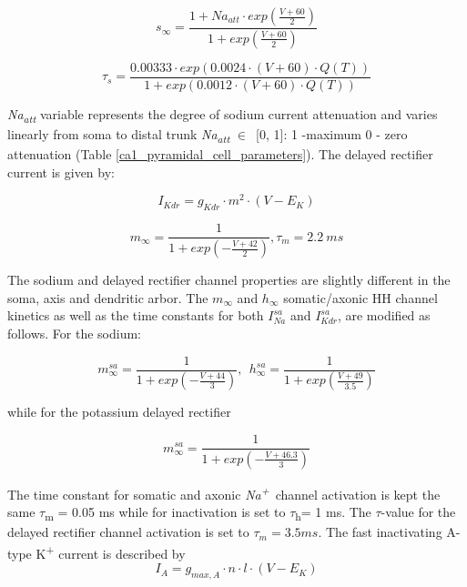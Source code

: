 \documentclass[a4paper,12pt]{article}
\begin{document}
\begin{equation}
s_{\infty}=\frac{1+Na_{att}\cdot exp(\frac{V+60}{2})}{1+exp(\frac{V+60}{2})}
\end{equation}


\begin{equation}
\tau_s=\frac{0.00333\cdot  exp(0.0024 \cdot (V+60)\cdot
		Q(T))}{1+exp(0.0012 \cdot (V+60)\cdot Q(T))}
\end{equation}

\textit{Na\textsubscript{att}} variable represents the degree of sodium current
attenuation and varies linearly from soma to distal trunk
\textit{Na\textsubscript{att}} $\in$~[0, 1]: 1 -maximum 0 - zero attenuation (Table \ref{ca1_pyramidal_cell_parameters}). The delayed rectifier current is given by:

\begin{equation}
I_{Kdr} = g_{Kdr} \cdot m^2 \cdot (V-E_K)
\end{equation}

\begin{equation}
m_{\infty}=\frac{1}{1+exp(-\frac{V+42}{2})}, \tau_m = 2.2 \ ms
\end{equation}

The sodium and delayed rectifier channel properties are slightly different in the soma, axis and dendritic arbor. The $m_{\infty}$ and $h_{\infty}$
somatic/axonic HH channel kinetics as well as the time constants for both $I_{Na}^{sa}$ and $I_{Kdr}^{sa}$, are modified as follows. For the sodium:

\begin{equation}
m_{\infty}^{sa}=\frac {1}{1+exp(-\frac{V+44}{3})} ,\ \ 
h_{\infty}^{sa}=\frac {1}{1+exp(\frac{V+49}{3.5})}
\end{equation}

while for the potassium delayed rectifier

\begin{equation}
m_{\infty}^{sa}=\frac {1}{1+exp(-\frac{V+46.3}{3})}
\end{equation}

The time constant for somatic and axonic \textit{Na\textsuperscript{+}}~channel activation is kept the
same $\tau$\textsubscript{m} = 0.05 ms while for inactivation is set to $\tau$\textsubscript{h}= 1 ms. The $\tau$-value for the delayed rectifier channel activation is set to $\tau_{m}= 3.5 ms$.
The fast inactivating A-type K\textsuperscript{+} current is described by
\begin{equation}
I_A = g_{max, A} \cdot n \cdot l \cdot (V - E_K)
\end{equation}
\end{document}
